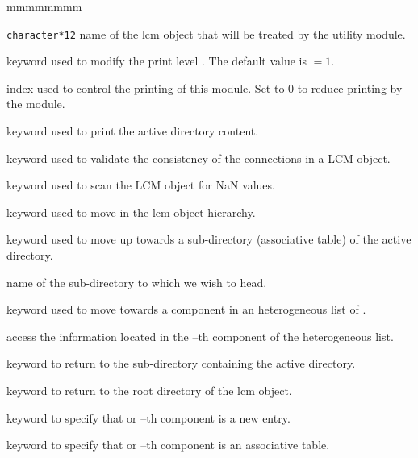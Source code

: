 \begin{ListeDeDescription}{mmmmmmmm}

\item[\dusa{NAME1}] {\tt character*12} name of the {\sc lcm} object that will be treated by the utility module.

\item[\moc{EDIT}] keyword used to modify the print level . The default value is  $=1$.

\item[\dusa{iprint}] index used to control the printing of this module. Set to 0 to
reduce printing by the module.

\item[\moc{DIR}] keyword used to print the active directory content.

\item[\moc{VAL}] keyword used to validate the consistency of the connections in a LCM object.

\item[\moc{NAN}] keyword used to scan the LCM object for NaN values.

\item[\moc{STEP}] keyword used to move in the {\sc lcm} object hierarchy.

\item[\moc{UP}] keyword used to move up towards a sub-directory (associative table) of the
active directory.

\item[\dusa{NOMDIR}] name of the sub-directory to which we wish to head.

\item[\moc{AT}] keyword used to move towards a component in an heterogeneous list of .

\item[\dusa{index}] access the information located in the --th component of the heterogeneous list.

\item[\moc{DOWN}] keyword to return to the sub-directory containing
the active directory.

\item[\moc{ROOT}] keyword to return to the root directory of the {\sc lcm} object.

\item[\moc{NEW}] keyword to specify that  or --th component is a new entry.

\item[\moc{DICT}] keyword to specify that  or --th component is an associative table.


\end{ListeDeDescription}
